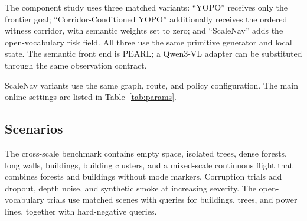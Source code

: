 \documentclass[letterpaper,10pt,conference]{ieeeconf}
\begin{document}
The component study uses three matched variants: ``YOPO'' receives only the
frontier goal; ``Corridor-Conditioned YOPO'' additionally receives the ordered
witness corridor, with semantic weights set to zero; and ``ScaleNav'' adds the
open-vocabulary risk field.  All three use the same primitive generator and
local state.  The semantic front end is PEARL; a Qwen3-VL adapter can be
substituted through the same observation contract.

ScaleNav variants use the same graph, route, and policy configuration.  The
main online settings are listed in Table~\ref{tab:params}.

\begin{table}[t]
\caption{Fixed Parameters Used by the Current Implementation}
\label{tab:params}
\centering
\small
{}
\end{table}

\subsection{Scenarios}
The cross-scale benchmark contains empty space, isolated trees, dense forests,
long walls, buildings, building clusters, and a mixed-scale continuous flight
that combines forests and buildings without mode markers.  Corruption trials
add dropout, depth noise, and synthetic smoke at increasing severity.  The
open-vocabulary trials use matched scenes with queries for buildings, trees,
and power lines, together with hard-negative queries.
\end{document}
